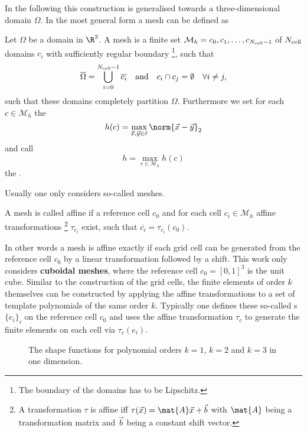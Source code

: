In the following this construction is generalised
towards a three-dimensional domain $\Omega$.
In the most general form a mesh can be defined as
\begin{defn}[Mesh]
	Let $\Omega$ be a domain in $\R^3$.
	A mesh is a finite set $\mathcal{M}_h = {c_0, c_1, \ldots, c_{N_\text{cell}-1}}$
	of $N_\text{cell}$ domains $c_i$ with sufficiently regular boundary%
	\footnote{The boundary of the domains has to be Lipschitz.},
	such that
	\begin{align*}
		\overline{\Omega} &= \bigcup_{i=0}^{N_\text{cell}-1} \overline{c_i}
		&&\text{and}
		&c_i \cap c_j = \emptyset \quad \forall i \neq j,
	\end{align*}
	\ie such that these domains completely partition $\Omega$.
	Furthermore we set for each $c \in \mathcal{M}_h$
	the 
	\[ h(c) = \max_{\vec{x},\vec{y} \in \bar{c}} \norm{\vec{x}-\vec{y}}_2 \]
	and call
	\[ h = \max_{c \in \mathcal{M}_h} h(c) \]
	the .
\end{defn}
\noindent
Usually one only considers so-called  meshes.
\begin{defn}
	A mesh is called affine if a reference cell $c_0$
	and for each cell $c_i \in \mathcal{M}_h$
	affine transformations%
	\footnote{A transformation $\tau$ is affine iff $\tau(\vec{x}) = \mat{A}\vec{x} + \vec{b}$ with $\mat{A}$ being a transformation matrix and $\vec{b}$ being a constant shift vector.}
	$\tau_{c_i}$ exist,
	such that $\overline{c_i} = \tau_{c_i}(c_0)$.
\end{defn}
In other words a mesh is affine exactly if each
grid cell can be generated from the reference cell $c_0$
by a linear transformation followed by a shift.
This work only considers \textbf{cuboidal meshes},
where the reference cell $c_0 = [0,1]^3$ is the unit cube.
Similar to the construction of the grid cells,
the finite elements of order $k$ themselves
can be constructed by applying the affine transformations
to a set of template polynomials of the same order $k$.
Typically one defines these so-called
s $\{e_i\}_i$
on the reference cell $c_0$
and uses the affine transformation $\tau_c$
to generate the finite elements on each cell
via $\tau_c(e_i)$.
%
\begin{figure}
	\centering
	\caption[Examples for shape functions in one dimension]{
		The shape functions for polynomial orders $k=1$, $k=2$ and $k=3$
		in one dimension.
	}
	\label{fig:ShapeFunctionsOneD}
\end{figure}
